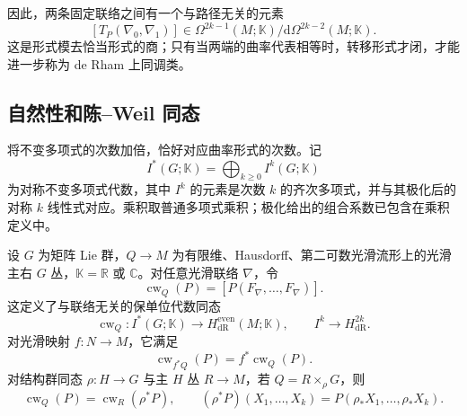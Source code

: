 因此，两条固定联络之间有一个与路径无关的元素
\[
	[T_P(\nabla_0,\nabla_1)]
	\in\Omega^{2k-1}(M;\mathbb K)/\mathrm d\Omega^{2k-2}(M;\mathbb K).
\]
这是形式模去恰当形式的商；只有当两端的曲率代表相等时，转移形式才闭，才能进一步称为 de Rham 上同调类。

\subsection{自然性和陈–Weil 同态}
\label{g2:subsec:2202:03}
将不变多项式的次数加倍，恰好对应曲率形式的次数。记
\[
	I^*(G;\mathbb K)=\bigoplus_{k\ge0}I^k(G;\mathbb K)
\]
为对称不变多项式代数，其中 \(I^k\) 的元素是次数 \(k\) 的齐次多项式，并与其极化后的对称 \(k\) 线性式对应。乘积取普通多项式乘积；极化给出的组合系数已包含在乘积定义中。

\begin{theorem}[陈--Weil 同态]\label{g2:thm:chern-weil-homomorphism}
	设 \(G\) 为矩阵 Lie 群，\(Q\to M\) 为有限维、Hausdorff、第二可数光滑流形上的光滑主右 \(G\) 丛，\(\mathbb K=\mathbb R\) 或 \(\mathbb C\)。对任意光滑联络 \(\nabla\)，令
	\begin{equation}\label{g2:eq:chern-weil-homomorphism}
		\operatorname{cw}_Q(P)=[P(F_\nabla,\ldots,F_\nabla)].
	\end{equation}
	这定义了与联络无关的保单位代数同态
	\[
		\operatorname{cw}_Q:I^*(G;\mathbb K)\longrightarrow
		H_{\mathrm{dR}}^{\mathrm{even}}(M;\mathbb K),
		\qquad I^k\longrightarrow H_{\mathrm{dR}}^{2k}.
	\]
	对光滑映射 \(f:N\to M\)，它满足
	\begin{equation}\label{g2:eq:chern-weil-pullback}
		\operatorname{cw}_{f^*Q}(P)=f^*\operatorname{cw}_Q(P).
	\end{equation}
	对结构群同态 \(\rho:H\to G\) 与主 \(H\) 丛 \(R\to M\)，若 \(Q=R\times_\rho G\)，则
	\[
		\operatorname{cw}_{Q}(P)=\operatorname{cw}_{R}(\rho^*P),
		\qquad
		(\rho^*P)(X_1,\ldots,X_k)=P(\rho_*X_1,\ldots,\rho_*X_k).
	\]
\end{theorem}
